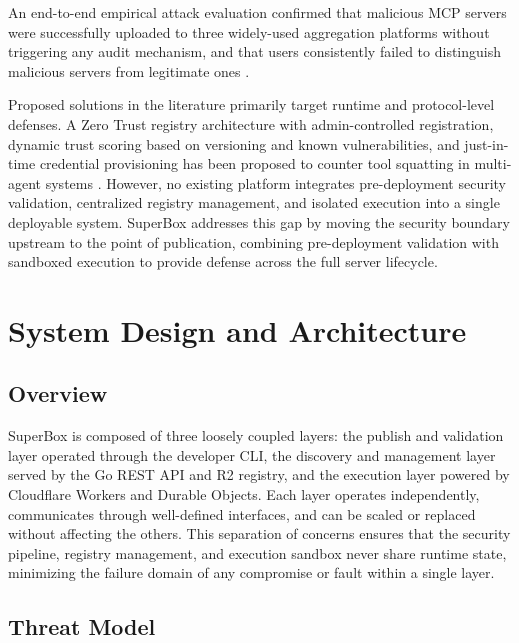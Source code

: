 \documentclass[conference]{IEEEtran}
\begin{document}
An end-to-end empirical attack evaluation confirmed that malicious MCP
servers were successfully uploaded to three widely-used aggregation
platforms without triggering any audit mechanism, and that users
consistently failed to distinguish malicious servers from legitimate
ones \cite{song2025}.

Proposed solutions in the literature primarily target runtime and
protocol-level defenses.
A Zero Trust registry architecture with admin-controlled registration,
dynamic trust scoring based on versioning and known vulnerabilities,
and just-in-time credential provisioning has been proposed to counter
tool squatting in multi-agent systems \cite{narajala2025}.
However, no existing platform integrates pre-deployment security
validation, centralized registry management, and isolated execution
into a single deployable system.
SuperBox addresses this gap by moving the security boundary upstream
to the point of publication, combining pre-deployment validation with
sandboxed execution to provide defense across the full server lifecycle.

\section{System Design and Architecture}
\label{sec:design}

\subsection{Overview}

SuperBox is composed of three loosely coupled layers: the publish and
validation layer operated through the developer CLI, the discovery and
management layer served by the Go REST API and R2 registry, and the
execution layer powered by Cloudflare Workers and Durable Objects.
Each layer operates independently, communicates through well-defined
interfaces, and can be scaled or replaced without affecting the others.
This separation of concerns ensures that the security pipeline, registry
management, and execution sandbox never share runtime state, minimizing
the failure domain of any compromise or fault within a single layer.

\subsection{Threat Model}
\end{document}
